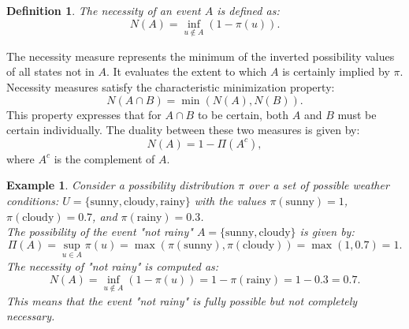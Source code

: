 \documentclass[seminar,english,m]{AIGpaper}
\newtheorem{definition}{Definition}
\newtheorem{example}{Example}
\begin{document}
\begin{definition}  
	The necessity of an event \( A \) is defined as:  
	\[
	N(A) = \inf_{u \notin A} \left( 1 - \pi \left( u \right) \right).
	\]  
\end{definition}  
The necessity measure represents the minimum of the inverted possibility values of all states not in \( A \). It evaluates the extent to which \( A \) is certainly implied by \( \pi \). Necessity measures satisfy the characteristic minimization property:  
\[
N \left( A \cap B \right)  = \min \left( N \left( A \right) , N \left( B \right) \right).
\]  
This property expresses that for \( A \cap B \) to be certain, both \( A \) and \( B \) must be certain individually.  
The duality between these two measures is given by:  
\[
N \left( A \right)  = 1 - \Pi \left( A^c \right),
\]  
where \( A^c \) is the complement of \( A \).  
\begin{example}
	Consider a possibility distribution $ \pi $ over a set of possible weather conditions: $ U = \{ \text{sunny}, \text{cloudy}, \text{rainy} \} $ with the values $ \pi(\text{sunny}) = 1 $, $ \pi(\text{cloudy}) = 0.7 $, and $ \pi(\text{rainy}) = 0.3 $. \\
	The possibility of the event "not rainy" $ A = \{ \text{sunny}, \text{cloudy} \} $ is given by: 
	\[
	\Pi(A) = \sup_{u \in A} \pi(u) = \max(\pi(\text{sunny}), \pi(\text{cloudy})) = \max(1, 0.7) = 1.
	\]
	The necessity of "not rainy" is computed as:
	\[
	N(A) = \inf_{u \notin A} (1 - \pi(u)) = 1 - \pi(\text{rainy}) = 1 - 0.3 = 0.7.
	\]
	This means that the event "not rainy" is fully possible but not completely necessary.
\end{example}
\end{document}

